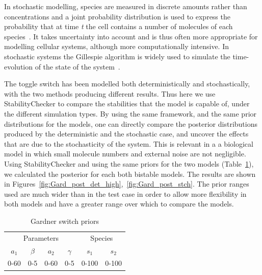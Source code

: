In stochastic modelling, species are measured in discrete amounts rather than concentrations and a joint probability distribution is used to express the probability that at time \textit{t} the cell contains a number of molecules of each species~\autocite{deJong:2002ft}. It takes uncertainty into account and is thus often more appropriate for modelling cellular systems, although more computationally intensive. In stochastic systems the Gillespie algorithm is widely used to simulate the time-evolution of the state of the system~\autocite{Warren:2005kea}.

The toggle switch has been modelled both deterministically and stochastically, with the two methods producing different results. Thus here we use StabilityChecker to compare the stabilities that the model is capable of, under the different simulation types. By using the same framework, and the same prior distributions for the models, one can directly compare the posterior distributions produced by the deterministic and the stochastic case, and uncover the effects that are due to the stochasticity of the system. This is relevant in a a biological model in which small molecule numbers and external noise are not negligible. Using StabilityChecker and using the same priors for the two models (Table~\ref{tab:gard_det_stoch}), we calculated the posterior for each both bistable models. The results are shown in Figures~\ref{fig:Gard_post_det_high},~\ref{fig:Gard_post_stch}. The prior ranges used are much wider than in the test case in order to allow more flexibility in both models and have a greater range over which to compare the models. 


\begin{table}[h]
\centering
\caption{Gardner switch priors}
\label{tab:gard_det_stoch}
\begin{tabular}{cccc|cc}
\multicolumn{4}{c|}{Parameters} & \multicolumn{2}{c}{Species} \\ %
$a_1$   & $\beta$   & $a_2$   & $\gamma$  &   $s_1$      &       $s_2$   \\
0-60    & 0-5       & 0-60    &  0-5      &      0-100   &          0-100   
\end{tabular}
\end{table}


